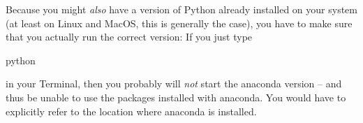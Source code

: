 \documentclass[a4paper,12pt]{book}
\begin{document}
\begin{appendices}
Because you might \emph{also} have a version of Python already installed on your system (at least on Linux and MacOS, this is generally the case), you have to make sure that you actually run the correct version: If you just type
\begin{lstlistingbash}
python
\end{lstlistingbash}
in your Terminal, then you probably will \emph{not} start the anaconda version -- and thus be unable to use the packages installed with anaconda. You would have to explicitly refer to the location where anaconda is installed.

\end{appendices}

\backmatter





\end{document}
